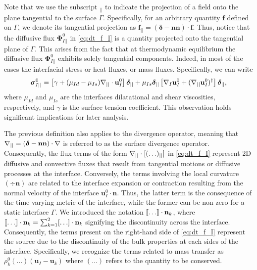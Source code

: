 Note that we use the subscript  $_{||}$ to indicate the projection of a field onto the plane tangential to the surface $\Gamma$. 
Specifically, for an arbitrary quantity $\textbf{f}$ defined on $\Gamma$, we denote its tangential projection as $\textbf{f}_{||} = (\bm\delta-\textbf{nn})\cdot \textbf{f}$. 
Thus, notice that the diffusive flux $\bm\Phi_{I||}^0$ in \ref{eq:dt_f_I} is a quantity projected onto the tangential plane of $\Gamma$.
This arises from the fact that at thermodynamic equilibrium the diffusive flux $\bm\Phi_{I||}^0$ exhibits solely tangential components.
Indeed, in most of the cases the interfacial stress or heat fluxes, or mass fluxes.  
Specifically, we can write \citep{nadim1996concise,bothe2022sharp}
\begin{equation}
    \bm\sigma_{I||}^0 = \left[\gamma + (\mu_{Id} -\mu_{Is}) \mathbf{\nabla}_{||}\cdot\textbf{u}_I^0\right] \bm\delta_{||}
    +  \mu_{Is} \bm\delta_{||} \left[\mathbf{\nabla}_I\textbf{u}_I^0 + (\mathbf{\nabla}_{||} \textbf{u}_I^0)^\dagger\right] \bm\delta_{||},
    \label{eq:surface_fluxes}
\end{equation}
where $\mu_{Id}$ and $\mu_{Is}$ are the interfaces dilatational and shear viscosities, respectively, and $\gamma$ is the surface tension coefficient. 
This observation holds significant implications for later analysis.

The previous definition also applies to the divergence operator, meaning that $\mathbf{\nabla}_{||}= (\bm\delta-\textbf{nn})\cdot \mathbf{\nabla}$ is referred to as the surface divergence operator. 
Consequently, the flux terms of the form $\mathbf{\nabla}_{||}\cdot[(\ldots)_{||}]$ in \ref{eq:dt_f_I} represent 2D diffusive and convective fluxes that result from tangential motions or diffusive processes at the interface. 
Conversely, the terms involving the local curvature $(\div \textbf{n})$ are related to the interface expansion or contraction resulting from the normal velocity of the interface $\textbf{u}_I^0\cdot \textbf{n}$. 
Thus, the latter term is the consequence of the time-varying metric of the interface, while the former can be non-zero for a static interface $\Gamma$. 
We introduced the notation $\llbracket \ldots \rrbracket \cdot \textbf{n}_k$, where $\llbracket \ldots \rrbracket \cdot \textbf{n}_k = \sum_{k=1}^2 [\ldots] \cdot \textbf{n}_k$ signifying the discontinuity across the interface.
Consequently, the terms present on the right-hand side of \ref{eq:dt_f_I} represent the source due to the discontinuity of the bulk properties at each sides of the interface. 
Specifically, we recognize the terms related to mass transfer as $\rho_k^0 (\ldots) (\textbf{u}_I - \textbf{u}_k)$ where $(\ldots)$ refers to the quantity to be conserved. 




